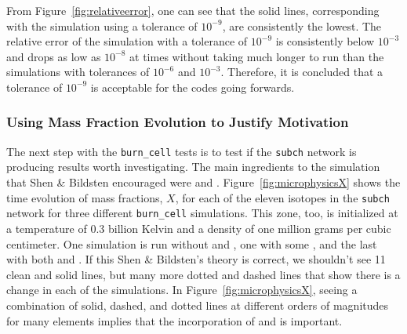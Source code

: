 \documentclass[preprint]{aastex62}
\begin{document}
      From Figure~\ref{fig:relativeerror}, one can see that the solid lines, corresponding with the simulation using a tolerance of $10^{-9}$, are consistently the lowest. The relative error of the simulation with a tolerance of $10^{-9}$ is consistently below $10^{-3}$ and drops as low as $10^{-8}$ at times without taking much longer to run than the simulations with tolerances of $10^{-6}$ and $10^{-3}$. Therefore, it is concluded that a tolerance of $10^{-9}$ is acceptable for the codes going forwards. 
  
    \subsubsection{Using Mass Fraction Evolution to Justify Motivation}
    
      The next step with the {\tt burn\_cell} tests is to test if the {\tt subch} network is producing results worth investigating. The main ingredients to the simulation that Shen \& Bildsten encouraged were  and  \citep{shenNbildsten}. Figure~\ref{fig:microphysicsX} shows the time evolution of mass fractions, $X$, for each of the eleven isotopes in the {\tt subch} network for three different {\tt burn\_cell} simulations. This zone, too, is initialized at a temperature of 0.3 billion Kelvin and a density of one million grams per cubic centimeter. One simulation is run without  and , one with some , and the last with both  and . If this Shen \& Bildsten's theory is correct, we shouldn't see 11 clean and solid lines, but many more dotted and dashed lines that show there is a change in each of the simulations. In Figure~\ref{fig:microphysicsX}, seeing a combination of solid, dashed, and dotted lines at different orders of magnitudes for many elements implies that the incorporation of  and  is important. 
      
\end{document}
